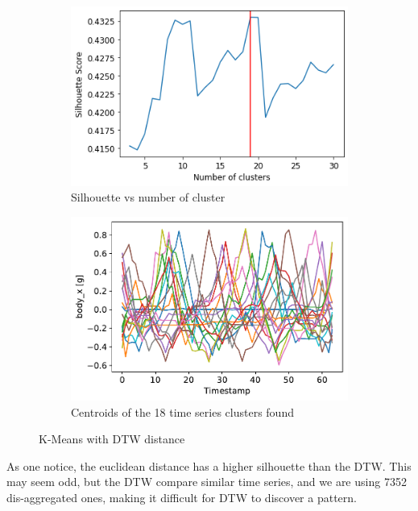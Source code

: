 \documentclass[10pt, a4paper, twocolumn]{article}
\begin{document}
\begin{figure}
    \centering
    \begin{subfigure}[t]{0.45\columnwidth}
    \includegraphics[width=\linewidth]{KMeans_DTW_30.png}
    \caption{Silhouette vs number of cluster}
    \label{fig:sildtw}
    \end{subfigure}
    \begin{subfigure}[t]{0.44\columnwidth}
    \includegraphics[width=\linewidth]{X_64_18_cluster_dtw.pdf}
    \caption{Centroids of the 18 time series clusters found}
    \label{fig:18cl}
    \end{subfigure}
\caption{K-Means with DTW distance}
\label{fig:kmeansdtw}
\end{figure}

As one notice, the euclidean distance has a higher silhouette than the DTW. This may seem odd, but the DTW compare similar time series, and we are using 7352 dis-aggregated ones, making it difficult for DTW to discover a pattern.  
\end{document}
